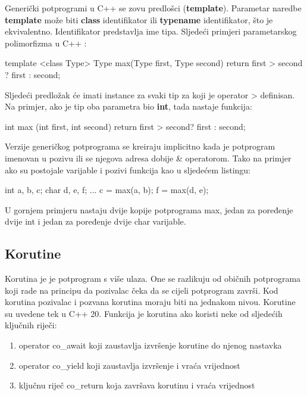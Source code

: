 \documentclass[11pt]{book}
\begin{document}
Generički  potprogrami  u  C++  se  zovu  predlošci  (\textbf{template}).  Parametar  naredbe \textbf{template} može biti \textbf{class} identifikator ili \textbf{typename} identifikator, što je ekvivalentno. Identifikator predstavlja ime tipa. Sljedeći primjeri parametarskog polimorfizma u C++ :

\begin{shortlisting}
  template <class Type>
  Type max(Type first, Type second) {
      return first > second ? first : second;
    }
\end{shortlisting}

Sljedeći predložak će imati instance za svaki tip za koji je operator > definisan. Na primjer, ako je tip oba parametra bio \textbf{int}, tada nastaje funkcija:

\begin{shortlisting}
  int max (int first, int second) {
      return first > second? first : second;
    }
\end{shortlisting}

Verzije generičkog potprograma se kreiraju implicitno kada je potprogram imenovan u pozivu ili se njegova adresa dobije \& operatorom. Tako na primjer ako su postojale varijable i pozivi funkcija kao u sljedećem listingu:

\begin{shortlisting}
  int a, b, c;
  char d, e, f;
  ...
  c = max(a, b);
  f = max(d, e);
\end{shortlisting}

U gornjem primjeru nastaju dvije kopije potprograma max, jedan za poređenje dvije int i jedan za poređenje dvije char varijable.

\subsection{Korutine}
Korutina je je potprogram s više ulaza. One se razlikuju od običnih potprograma koji rade na principu da pozivalac čeka da se cijeli potprogram završi. Kod korutina pozivalac i pozvana korutina moraju biti na jednakom nivou. Korutine su uvedene tek u C++ 20. Funkcija je korutina ako koristi neke od sljedećih ključnih riječi:
\begin{enumerate}
  \item  operator co\_await koji zaustavlja izvršenje korutine do njenog nastavka
  \item operator co\_yield koji zaustavlja izvršenje i vraća vrijednost
  \item ključnu riječ co\_return koja završava korutinu i vraća vrijednost
\end{enumerate}
\end{document}
